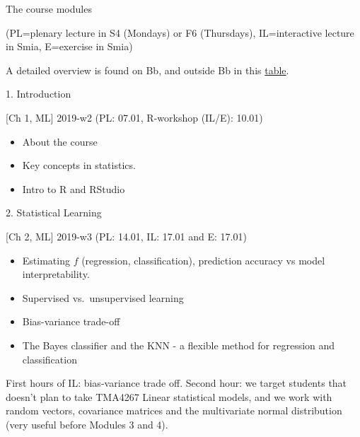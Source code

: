 \documentclass[10pt,ignorenonframetext,]{beamer}
\providecommand{\tightlist}{%
  \setlength{\itemsep}{0pt}\setlength{\parskip}{0pt}}
\begin{document}
\begin{frame}{The course modules}

(PL=plenary lecture in S4 (Mondays) or F6 (Thursdays), IL=interactive
lecture in Smia, E=exercise in Smia)

A detailed overview is found on Bb, and outside Bb in this
\href{https://www.math.ntnu.no/emner/TMA4268/2019v/table2019.html}{table}.

\begin{block}{1. Introduction}

{[}Ch 1, ML{]} 2019-w2 (PL: 07.01, R-workshop (IL/E): 10.01)

\begin{itemize}
\tightlist
\item
  About the course
\item
  Key concepts in statistics.
\item
  Intro to R and RStudio
\end{itemize}

\end{block}

\end{frame}

\begin{frame}

\begin{block}{2. Statistical Learning}

{[}Ch 2, ML{]} 2019-w3 (PL: 14.01, IL: 17.01 and E: 17.01)

\begin{itemize}
\tightlist
\item
  Estimating \(f\) (regression, classification), prediction accuracy vs
  model interpretability.
\item
  Supervised vs.~unsupervised learning
\item
  Bias-variance trade-off
\item
  The Bayes classifier and the KNN - a flexible method for regression
  and classification
\end{itemize}

First hours of IL: bias-variance trade off. Second hour: we target
students that doesn't plan to take TMA4267 Linear statistical models,
and we work with random vectors, covariance matrices and the
multivariate normal distribution (very useful before Modules 3 and 4).

\end{block}

\end{frame}
\end{document}
